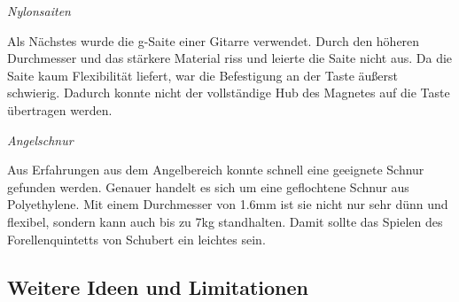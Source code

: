\textit{Nylonsaiten}

Als Nächstes wurde die g-Saite einer Gitarre verwendet.
Durch den höheren Durchmesser und das stärkere Material riss und leierte die Saite nicht aus.
Da die Saite kaum Flexibilität liefert, war die Befestigung an der Taste äußerst schwierig.
Dadurch konnte nicht der vollständige Hub des Magnetes auf die Taste übertragen werden.

\textit{Angelschnur}

Aus Erfahrungen aus dem Angelbereich konnte schnell eine geeignete Schnur gefunden werden.
Genauer handelt es sich um eine geflochtene Schnur aus Polyethylene.
Mit einem Durchmesser von 1.6mm ist sie nicht nur sehr dünn und flexibel, sondern kann auch bis zu 7kg standhalten.
Damit sollte das Spielen des Forellenquintetts von Schubert ein leichtes sein.



\subsection{Weitere Ideen und Limitationen}
